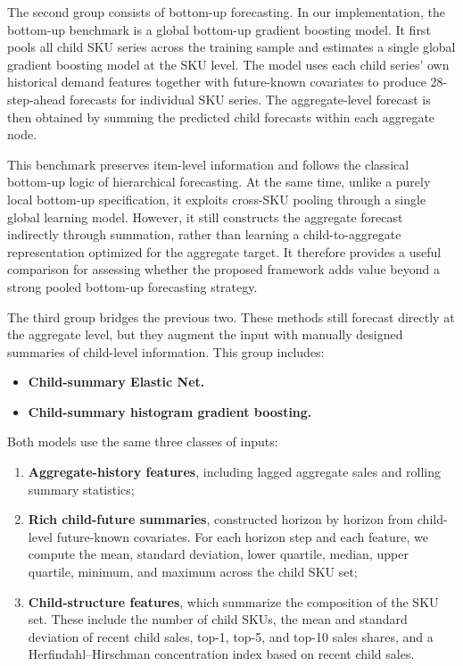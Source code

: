 \documentclass[12pt]{article}
\begin{document}
The second group consists of bottom-up forecasting. In our implementation, the bottom-up benchmark is a global bottom-up gradient boosting model. It first pools all child SKU series across the training sample and estimates a single global gradient boosting model at the SKU level. The model uses each child series' own historical demand features together with future-known covariates to produce 28-step-ahead forecasts for individual SKU series. The aggregate-level forecast is then obtained by summing the predicted child forecasts within each aggregate node.

This benchmark preserves item-level information and follows the classical bottom-up logic of hierarchical forecasting. At the same time, unlike a purely local bottom-up specification, it exploits cross-SKU pooling through a single global learning model. However, it still constructs the aggregate forecast indirectly through summation, rather than learning a child-to-aggregate representation optimized for the aggregate target. It therefore provides a useful comparison for assessing whether the proposed framework adds value beyond a strong pooled bottom-up forecasting strategy.

The third group bridges the previous two. These methods still forecast directly at the aggregate level, but they augment the input with manually designed summaries of child-level information. This group includes:

\begin{itemize}
  \item \textbf{Child-summary Elastic Net.}
  \item \textbf{Child-summary histogram gradient boosting.}
\end{itemize}

Both models use the same three classes of inputs:

\begin{enumerate}
  \item \textbf{Aggregate-history features}, including lagged aggregate sales and rolling summary statistics;

  \item \textbf{Rich child-future summaries}, constructed horizon by horizon from child-level future-known covariates. For each horizon step and each feature, we compute the mean, standard deviation, lower quartile, median, upper quartile, minimum, and maximum across the child SKU set;

  \item \textbf{Child-structure features}, which summarize the composition of the SKU set. These include the number of child SKUs, the mean and standard deviation of recent child sales, top-1, top-5, and top-10 sales shares, and a Herfindahl--Hirschman concentration index based on recent child sales.
\end{enumerate}
\end{document}
